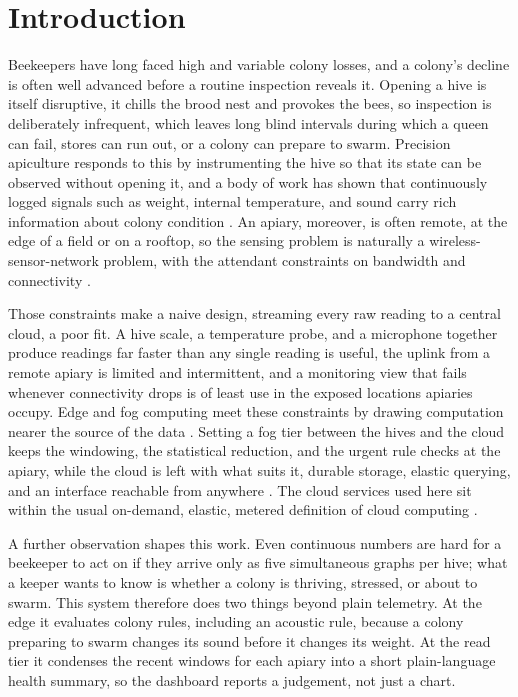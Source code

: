 \documentclass[conference]{IEEEtran}
\begin{document}
\section{Introduction}

Beekeepers have long faced high and variable colony losses, and a colony's decline is often well advanced before a routine inspection reveals it. Opening a hive is itself disruptive, it chills the brood nest and provokes the bees, so inspection is deliberately infrequent, which leaves long blind intervals during which a queen can fail, stores can run out, or a colony can prepare to swarm. Precision apiculture responds to this by instrumenting the hive so that its state can be observed without opening it, and a body of work has shown that continuously logged signals such as weight, internal temperature, and sound carry rich information about colony condition \cite{zacepins2015, meikle2015}. An apiary, moreover, is often remote, at the edge of a field or on a rooftop, so the sensing problem is naturally a wireless-sensor-network problem, with the attendant constraints on bandwidth and connectivity \cite{akyildiz2002}.

Those constraints make a naive design, streaming every raw reading to a central cloud, a poor fit. A hive scale, a temperature probe, and a microphone together produce readings far faster than any single reading is useful, the uplink from a remote apiary is limited and intermittent, and a monitoring view that fails whenever connectivity drops is of least use in the exposed locations apiaries occupy. Edge and fog computing meet these constraints by drawing computation nearer the source of the data \cite{shi2016}. Setting a fog tier between the hives and the cloud keeps the windowing, the statistical reduction, and the urgent rule checks at the apiary, while the cloud is left with what suits it, durable storage, elastic querying, and an interface reachable from anywhere \cite{bonomi2012, naha2018}. The cloud services used here sit within the usual on-demand, elastic, metered definition of cloud computing \cite{mell2011}.

A further observation shapes this work. Even continuous numbers are hard for a beekeeper to act on if they arrive only as five simultaneous graphs per hive; what a keeper wants to know is whether a colony is thriving, stressed, or about to swarm. This system therefore does two things beyond plain telemetry. At the edge it evaluates colony rules, including an acoustic rule, because a colony preparing to swarm changes its sound before it changes its weight. At the read tier it condenses the recent windows for each apiary into a short plain-language health summary, so the dashboard reports a judgement, not just a chart.
\end{document}

